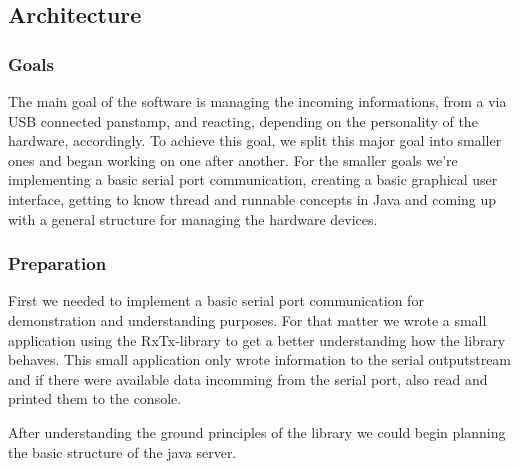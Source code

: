 \subsection{Architecture}
\subsubsection{Goals}

The main goal of the software is managing the incoming informations, from a via USB connected panstamp, and reacting, depending on the personality of the hardware, accordingly. To achieve this goal, we split this major goal into smaller ones and began working on one after another.
\newline
For the smaller goals we're implementing a basic serial port communication, creating a basic graphical user interface, getting to know thread and runnable concepts in Java and coming up with a general structure for managing the hardware devices.

\subsubsection{Preparation}
First we needed to implement a basic serial port communication for demonstration and understanding purposes. For that matter we wrote a small application using the RxTx-library to get a better understanding how the library behaves. This small application only wrote information to the serial outputstream and if there were available data incomming from the serial port, also read and printed them to the console.

After understanding the ground principles of the library we could begin planning the basic structure of the java server.



